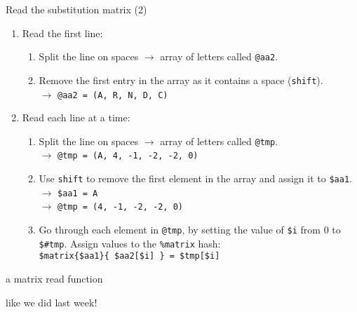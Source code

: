 \documentclass[pdf]{beamer}
\begin{document}
\begin{frame}[fragile]{Read the substitution matrix (2)}
  \begin{enumerate}
  \item Read the first line:
    \begin{enumerate}
    \item Split the line on spaces $\rightarrow$ array of letters called
      \texttt{@aa2}.
      \pause
    \item Remove the first entry in the array as it contains a space
      (\texttt{shift}).\\
      \pause
      $\rightarrow$ \verb|@aa2 = (A, R, N, D, C)|
    \end{enumerate}
    \pause
  \item Read each line at a time:
    \begin{enumerate}
    \item Split the line on spaces $\rightarrow$ array of letters called
      \texttt{@tmp}.\\
      \pause
      $\rightarrow$ \verb|@tmp = (A, 4, -1, -2, -2, 0)|
      \pause
    \item Use \texttt{shift} to remove the first element in the array and
      assign it to \verb|$aa1|.\\
      \pause
      $\rightarrow$ \verb|$aa1 = A|\\
      $\rightarrow$ \verb|@tmp = (4, -1, -2, -2, 0)|\\
      \pause
    \item Go through each element in \verb|@tmp|, by setting the value of
      \verb|$i| from 0 to \verb|$#tmp|. Assign values to 
      the \verb|%matrix| hash:\\
      \verb|$matrix{$aa1}{ $aa2[$i] } = $tmp[$i]|
    \end{enumerate}
  \end{enumerate}
\end{frame}

\begin{frame}[fragile]{a matrix read function}

  like we did last week!
\end{frame}
\end{document}
